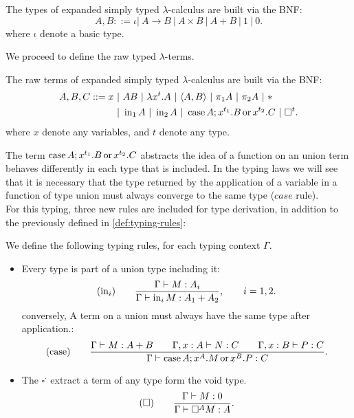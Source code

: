 \begin{definition}
  The types of expanded simply typed $\lambda$-calculus are built via the BNF:
  $$A,B ::= \iota |\ A\to B\ |\ A \times B \ |\ A + B  \ |\ 1\ |\ 0.$$
  where $\iota$ denote a basic type. 
\end{definition}

We proceed to define the raw typed $\lambda$-terms.

\begin{definition}
  The raw terms of expanded simply typed $\lambda$-calculus are built via the BNF:
  \begin{align*}
    A,B, C ::= x\ &|\ AB\ |\ \lambda x^t.A \ |\ \langle A,B \rangle\ |\ \pi_1A\ |\ \pi_2A\ |\ * \\
               &|\ \iin_1 A\ |\ \iin_2 A \ |\ \ccase A ; x^{t_1}.B\oo x^{t_2}.C \ |\ \square^t. 
  \end{align*}
  where $x$ denote any variables, and $t$ denote any type. 
\end{definition}

The term $\operatorname{case} A ; x^{t_1}.B\operatorname{ or } x^{t_2}.C$ abstracts the idea of a function on  an union term behaves differently in each type that is included. In the typing laws we will see that it is necessary that the type returned by the application of a variable in a function of type union must always converge to the same type ($case$ rule).\\

For this typing, three new rules are included for type derivation, in addition to the previously defined in \ref{def:typing-rules}:
\begin{definition}
  We define the following typing rules, for each typing context $\Gamma$.
  \begin{itemize}
  \item Every type is part of a union type including it:
    $$  (\operatorname{in}_i)\qquad  {\displaystyle\Gamma \vdash M:A_i \over \Gamma \vdash \operatorname{in}_i M:A_1+A_2},\qquad  i=  1,2.$$
  conversely, A term on a union must always have the same type after application.:
    $$(\operatorname{case}) \qquad {\displaystyle \Gamma\vdash M: A+B\qquad \Gamma, x:A\vdash N: C\qquad \Gamma, x:B\vdash P: C \over \Gamma \vdash \operatorname{case}A ; x^{A}.M\operatorname{ or }x^{B}.P:C}.$$
  \item The $\square^\cdot$ extract a term of any type form the void type.
    $$  (\square)\qquad  {\displaystyle\Gamma \vdash M:0 \over \Gamma \vdash \square^A M:A}.$$
  \end{itemize}
\end{definition}

